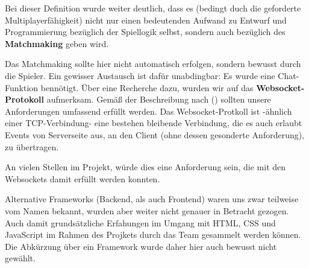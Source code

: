 Bei dieser Definition wurde weiter deutlich, dass es (bedingt duch die geforderte Multiplayerfähigkeit) nicht nur einen bedeutenden Aufwand zu Entwurf und Programmierung bezüglich der Spiellogik selbst, sondern auch bezüglich des \textbf{\gls{Matchmaking}} geben wird. 

Das \gls{Matchmaking} sollte hier nicht automatisch erfolgen, sondern bewusst durch die Spieler. Ein gewisser Austausch ist dafür unabdingbar: Es wurde eine Chat-Funktion bennötigt. Über eine Recherche dazu, wurden wir auf das \textbf{Websocket-Protokoll} aufmerksam. Gemäß der Beschreibung nach \citeauthor{heise-django-2011} (\citeyear{heise-django-2011}) sollten unsere Anforderungen umfassend erfüllt werden. Das Websocket-Protkoll ist -ähnlich einer TCP-Verbindung- eine bestehen bleibende Verbindung, die es auch erlaubt Events von Serverseite aus, an den Client (ohne dessen gesonderte Anforderung), zu übertragen. 

An vielen Stellen im Projekt, würde dies eine Anforderung sein, die mit den Websockets damit erfüllt werden konnten. 

Alternative Frameworks (Backend, als auch Frontend) waren uns zwar teilweise vom Namen bekannt, wurden aber weiter nicht genauer in Betracht gezogen. Auch damit grundsätzliche Erfahungen im Umgang mit HTML, CSS und JavaScript im Rahmen des Projkets durch das Team gesammelt werden können. Die Abkürzung über ein Framework wurde daher hier auch bewusst nicht gewählt. 

